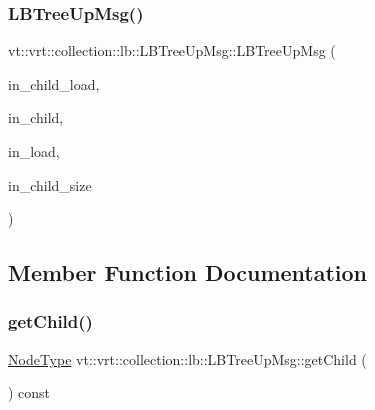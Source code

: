 \subsubsection{\texorpdfstring{L\+B\+Tree\+Up\+Msg()}{LBTreeUpMsg()}\hspace{0.1cm}{\footnotesize\ttfamily [2/2]}}
{\footnotesize\ttfamily vt\+::vrt\+::collection\+::lb\+::\+L\+B\+Tree\+Up\+Msg\+::\+L\+B\+Tree\+Up\+Msg (\begin{DoxyParamCaption}\item[{\hyperlink{structvt_1_1vrt_1_1collection_1_1lb_1_1_l_b_tree_up_msg_a94e88fdd5142e26330a7feb8769de1bb}{Load\+Type} const}]{in\+\_\+child\+\_\+load,  }\item[{\hyperlink{namespacevt_a866da9d0efc19c0a1ce79e9e492f47e2}{Node\+Type} const}]{in\+\_\+child,  }\item[{\hyperlink{structvt_1_1vrt_1_1collection_1_1lb_1_1_hier_l_b_types_a597a60d517207b90e8c7984eac434e8f}{Obj\+Sample\+Type}}]{in\+\_\+load,  }\item[{\hyperlink{namespacevt_a866da9d0efc19c0a1ce79e9e492f47e2}{Node\+Type} const}]{in\+\_\+child\+\_\+size }\end{DoxyParamCaption})\hspace{0.3cm}{\ttfamily [inline]}}



\subsection{Member Function Documentation}
\mbox{\label{structvt_1_1vrt_1_1collection_1_1lb_1_1_l_b_tree_up_msg_a430d99ecbeb875f33ecd1b4c33c6ea5f}} 
\subsubsection{\texorpdfstring{get\+Child()}{getChild()}}
{\footnotesize\ttfamily \hyperlink{namespacevt_a866da9d0efc19c0a1ce79e9e492f47e2}{Node\+Type} vt\+::vrt\+::collection\+::lb\+::\+L\+B\+Tree\+Up\+Msg\+::get\+Child (\begin{DoxyParamCaption}{ }\end{DoxyParamCaption}) const\hspace{0.3cm}{\ttfamily [inline]}}

